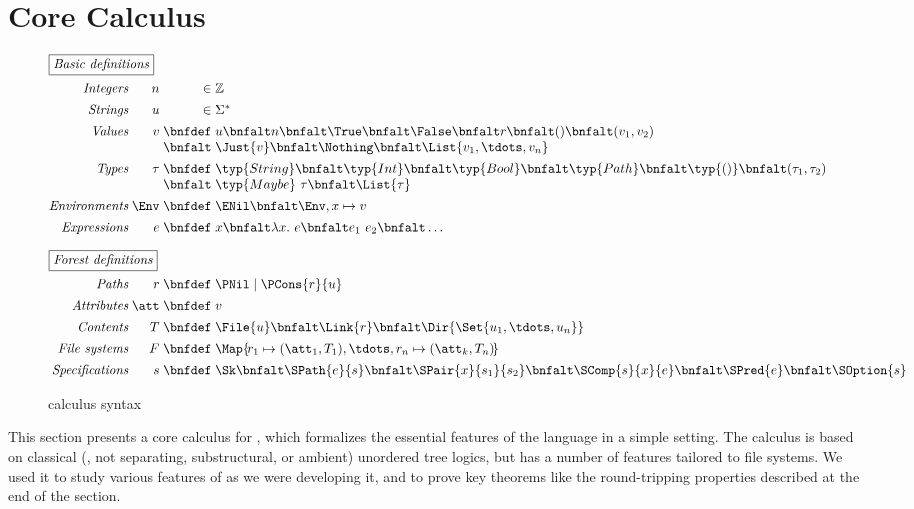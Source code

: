 \section{Core Calculus}
\label{sec:theory}

\begin{figure}
\[
\begin{array}{@{}r@{\;}r@{\;}r@{\;}l@{}}
\multicolumn{4}{@{}l}{\fbox{\textit{Basic definitions}}}\\[1.5ex]
\textit{Integers}     & n    & \in & \mathbb{Z}\\[1ex]
\textit{Strings}      & u    & \in & \Sigma^{\ast}\\[1ex]
\textit{Values}       & v    & \bnfdef & u \bnfalt n \bnfalt \True \bnfalt \False \bnfalt r \bnfalt () \bnfalt (v_1,v_2)\\
                      &      & \bnfalt &\Just{v} \bnfalt \Nothing \bnfalt \List{v_1,\tdots,v_n}\\[1ex]
\textit{Types}        & \tau & \bnfdef & \typ{String} \bnfalt \typ{Int} \bnfalt \typ{Bool} \bnfalt \typ{Path} \bnfalt \typ{()} \bnfalt (\tau_1,\tau_2) \\
                      &      & \bnfalt & \typ{Maybe}~\tau \bnfalt \List{\tau}\\[1ex]
\textit{Environments} & \Env & \bnfdef & \ENil \bnfalt \Env,x\mapsto v\\[1ex]
\textit{Expressions}  & e    & \bnfdef & x \bnfalt \lambda x.~e \bnfalt e_1~e_2 \bnfalt \dots \\[2.5ex]
%
\multicolumn{4}{@{}l}{\fbox{\textit{Forest definitions}}}\\[1.5ex]
\textit{Paths}          & r    & \bnfdef & \PNil \mid \PCons{r}{u}\\[1ex]
\textit{Attributes}     & \att & \bnfdef & v\\[1ex]
\textit{Contents}       & T    & \bnfdef & \File{u} \bnfalt \Link{r} \bnfalt \Dir{ \Set{u_1,\tdots,u_n} }\\[1ex]
\textit{File systems}   & F    & \bnfdef & \Map{ \! r_1 \mapsto (\att_1,T_1), \tdots, r_n \mapsto (\att_k,T_n) \! }\\[1ex]
\textit{Specifications} & s    & \bnfdef & \Sk \bnfalt \SPath{e}{s} \bnfalt \SPair{x}{s_1}{s_2} \bnfalt \SComp{s}{x}{e} \bnfalt \SPred{e} \bnfalt \SOption{s}
\end{array}
\]
\caption{\forest{} calculus syntax}
\label{fig:csyntax}
\end{figure}

This section presents a core calculus for \forest{}, which formalizes
the essential features of the language in a simple setting. The
calculus is based on classical (\ie{}, not separating, substructural,
or ambient) unordered tree logics, but has a number of features
tailored to file systems. We used it to study various features of
\forest{} as we were developing it, and to prove key theorems like the
round-tripping properties described at the end of the section.

